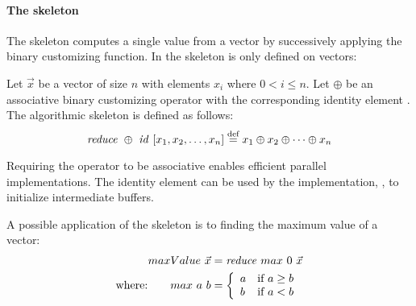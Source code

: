 \paragraph{The \reduce skeleton}
The \reduce skeleton computes a single value from a vector by successively applying the binary customizing function.
In \SkelCL the \reduce skeleton is only defined on vectors:
\begin{definition}
  \label{definition:reduce}
  Let $\vec{x}$ be a vector of size $n$ with elements $x_i$ where $0 < i \leq n$.
  Let $\oplus$ be an associative binary customizing operator with the corresponding identity element \id.
  The algorithmic skeleton \reduce is defined as follows:
  \begin{equation*}
    \text{\textit{reduce}}\ \oplus\ \text{\textit{id}}\ [x_1, x_2, \dots, x_n]
      \stackrel{\textrm{\scriptsize def}}{=} x_1 \oplus x_2 \oplus \dots \oplus x_n
  \end{equation*}
\end{definition}
\noindent
Requiring the operator to be associative enables efficient parallel implementations.
The identity element \id can be used by the implementation, \eg, to initialize intermediate buffers.

A possible application of the \reduce skeleton is to finding the maximum value of a vector:
\begin{align*}
  maxValue\ \vec{x} &= \text{\textit{reduce}}\ max\ 0\ \vec{x}\\
  \text{where:} \qquad max\ a\ b &=
    \left\{
      \begin{array}{l l}
      a & \text{if } a \geq b\\
      b & \text{if } a < b
      \end{array}
    \right.
\end{align*}


